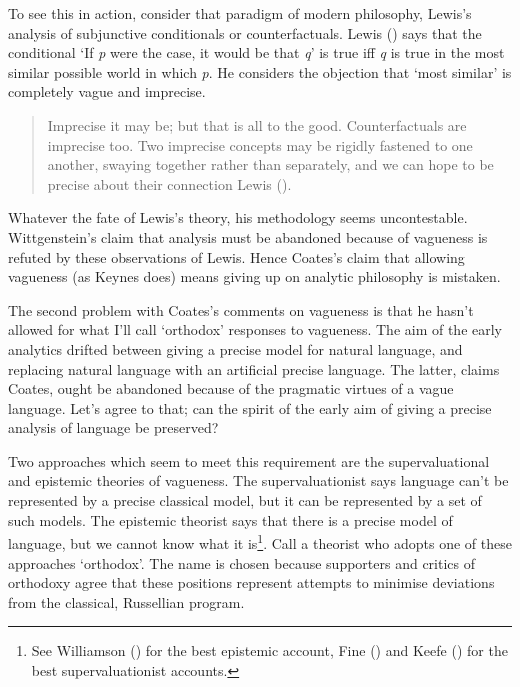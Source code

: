 \documentclass[
  11pt,
  letterpaper,
  DIV=11,
  numbers=noendperiod,
  twoside]{scrartcl}
\begin{document}
To see this in action, consider that paradigm of modern philosophy,
Lewis's analysis of subjunctive conditionals or counterfactuals. Lewis
() says that the conditional `If \emph{p}
were the case, it would be that \emph{q}' is true iff \emph{q} is true
in the most similar possible world in which \emph{p}. He considers the
objection that `most similar' is completely vague and imprecise.

\begin{quote}
Imprecise it may be; but that is all to the good. Counterfactuals are
imprecise too. Two imprecise concepts may be rigidly fastened to one
another, swaying together rather than separately, and we can hope to be
precise about their connection Lewis ().
\end{quote}

Whatever the fate of Lewis's theory, his methodology seems
uncontestable. Wittgenstein's claim that analysis must be abandoned
because of vagueness is refuted by these observations of Lewis. Hence
Coates's claim that allowing vagueness (as Keynes does) means giving up
on analytic philosophy is mistaken.

The second problem with Coates's comments on vagueness is that he hasn't
allowed for what I'll call `orthodox' responses to vagueness. The aim of
the early analytics drifted between giving a precise model for natural
language, and replacing natural language with an artificial precise
language. The latter, claims Coates, ought be abandoned because of the
pragmatic virtues of a vague language. Let's agree to that; can the
spirit of the early aim of giving a precise analysis of language be
preserved?

Two approaches which seem to meet this requirement are the
supervaluational and epistemic theories of vagueness. The
supervaluationist says language can't be represented by a precise
classical model, but it can be represented by a set of such models. The
epistemic theorist says that there is a precise model of language, but
we cannot know what it is\footnote{See Williamson
  () for the best epistemic
  account, Fine () and Keefe
  () for the best supervaluationist
  accounts.}. Call a theorist who adopts one of these approaches
`orthodox'. The name is chosen because supporters and critics of
orthodoxy agree that these positions represent attempts to minimise
deviations from the classical, Russellian program.
\end{document}
